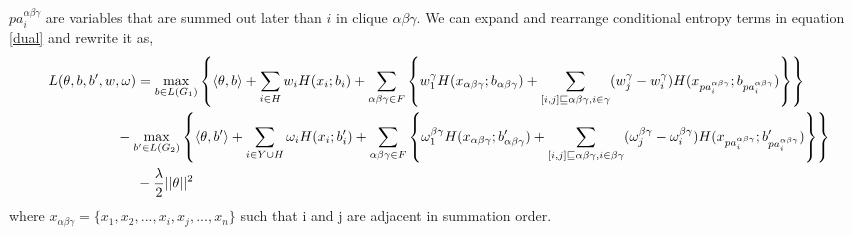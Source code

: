 \documentclass{article}
\begin{document}
$pa_i^{\alpha\beta\gamma}$ are variables that are summed out later than $i$ in clique $\alpha\beta\gamma$.
We can expand and rearrange conditional entropy terms in equation \ref{dual} and rewrite it as,
\begin{align*}
L(\theta,b,b',w,\omega)&= \max_{b\in L(G_1)}  \left\{ \langle \theta,b \rangle+\sum_{i\in H}w_iH(x_i;b_i)+\sum_{\alpha\beta\gamma\in F} \left\{ w_1^{\gamma}H(x_{\alpha\beta\gamma};b_{\alpha\beta\gamma})+\sum_{[i,j]\sqsubseteq \alpha\beta\gamma, i\in \gamma}(w_j^{\gamma}-w_i^{\gamma})H(x_{pa_i^{\alpha\beta\gamma}};b_{pa_i^{\alpha\beta\gamma}}) \right \}\right \} \nonumber \\&\hspace{-5mm}- \max_{b'\in L(G_2)}  \left\{ \langle \theta,b' \rangle+\sum_{i\in Y\cup H}\omega_iH(x_i;b'_i)+\sum_{\alpha\beta\gamma\in F}\left\{ \omega_1^{\beta\gamma}H(x_{\alpha\beta\gamma};b'_{\alpha\beta\gamma})+\sum_{[i,j]\sqsubseteq \alpha\beta\gamma,i\in \beta\gamma}(\omega_j^{\beta\gamma}-\omega_i^{\beta\gamma})H(x_{pa_i^{\alpha\beta\gamma}};b'_{pa_i^{\alpha\beta\gamma}}) \right \}  \right\} \\&- \frac{\lambda}{2}||\theta||^2
\end{align*}
where $x_{\alpha\beta\gamma}=\{x_1,x_2,...,x_i,x_j,...,x_n\}$ such that i and j are adjacent in summation order. 
\end{document}
